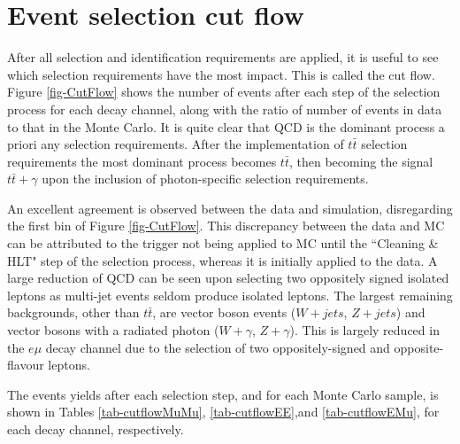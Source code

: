 \section{Event selection cut flow} \label{sec-cutflow}

After all selection and identification requirements are applied, it is useful to see which selection requirements have the most impact. This is called the cut flow. Figure \ref{fig-CutFlow} shows the number of events after each step of the selection process for each decay channel, along with the ratio of number of events in data to that in the Monte Carlo. It is quite clear that QCD is the dominant process a priori any selection requirements. After the implementation of $t\bar{t}$ selection requirements the most dominant process becomes $t\bar{t}$, then becoming the signal $t\bar{t}+\gamma$ upon the inclusion of photon-specific selection requirements. 

An excellent agreement is observed between the data and simulation, disregarding the first bin of Figure \ref{fig-CutFlow}. This discrepancy between the data and MC can be attributed to the trigger not being applied to MC until the ``Cleaning \& HLT" step of the selection process, whereas it is initially applied to the data. A large reduction of QCD can be seen upon selecting two oppositely signed isolated leptons as multi-jet events seldom produce isolated leptons. The largest remaining backgrounds, other than $t\bar{t}$, are vector boson events ($W+jets$, $Z+jets$) and vector bosons with a radiated photon ($W+\gamma$, $Z+\gamma$). This is largely reduced in the $e\mu$ decay channel due to the selection of two oppositely-signed and opposite-flavour leptons. 

The events yields after each selection step, and for each Monte Carlo sample, is shown in Tables \ref{tab-cutflowMuMu}, \ref{tab-cutflowEE},and \ref{tab-cutflowEMu}, for each decay channel, respectively. 

